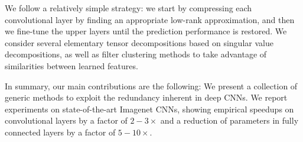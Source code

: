 We follow a relatively simple strategy: we start by compressing each 
convolutional layer by finding an appropriate low-rank approximation, 
and then we fine-tune the upper layers until the prediction performance 
is restored. We consider several elementary tensor decompositions based 
on singular value decompositions, as well as filter clustering methods to take advantage of similarities between learned features. 

In summary, our main contributions are the following:
We present a collection of generic methods to exploit the redundancy inherent in deep CNNs.
We report experiments on state-of-the-art Imagenet CNNs, showing empirical speedups on 
convolutional layers by a factor of $2-3\times$ and a reduction of parameters in fully connected layers by a factor of $5-10\times$.






